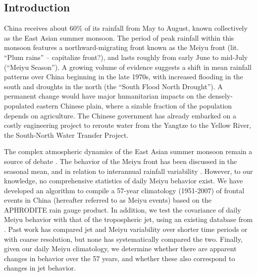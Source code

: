 \documentclass[draft,grl]{AGUTeX}
\begin{document}
\begin{article}



\section{Introduction}
 
 China receives about 60\% of its rainfall from May to August, known collectively as the East Asian summer monsoon. The period of peak rainfall within this monsoon features a northward-migrating front known as the Meiyu front (lit. ``Plum rains''  -- capitalize front?), and lasts roughly from early June to mid-July (``Meiyu Season''). A growing volume of evidence suggests a shift in mean rainfall patterns over China beginning in the late 1970s, with increased flooding in the south and droughts in the north (the ``South Flood North Drought''). A permanent change would have major humanitarian impacts on the densely-populated eastern Chinese plain, where a sizable fraction of the population depends on agriculture. The Chinese government has already embarked on a costly engineering project to reroute water from the Yangtze to the Yellow River, the South-North Water Transfer Project.
 
	The complex atmospheric dynamics of the East Asian summer monsoon remain a source of debate \citep{Sampe2010,Chen2014}. The behavior of the Meiyu front has been discussed in the seasonal mean\citep{Ding2005}, and in relation to interannual rainfall variability \citep{Kosaka2011}. However, to our knowledge, no comprehensive statistics of daily Meiyu behavior exist. We have developed an algorithm to compile a 57-year climatology (1951-2007) of frontal events in China (hereafter referred to as Meiyu events) based on the APHRODITE rain gauge product. In addition, we test the covariance of daily Meiyu behavior with that of the tropospheric jet, using an existing database from \citet{Schiemann2009}. Past work has compared jet and Meiyu variability over shorter time periods or with coarse resolution\cite{Liang1998}, but none has systematically compared the two.  Finally, given our daily Meiyu climatology, we determine whether there are apparent changes in behavior over the 57 years, and whether these also correspond to changes in jet behavior.




\end{article}
\end{document}

